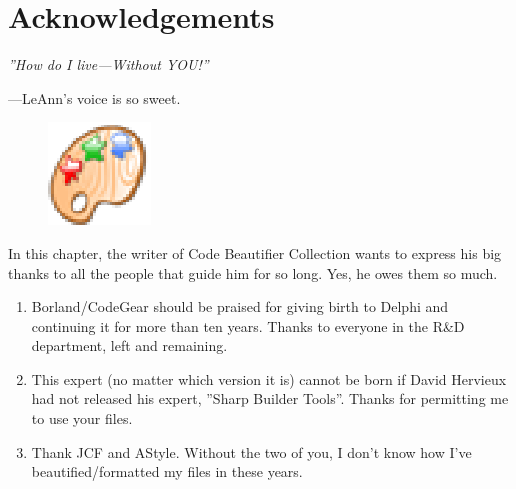 \chapter{Acknowledgements}
\emph{''How do I live---Without YOU!''}

---LeAnn's voice is so sweet.
\begin{figure}[!hbp]
\begin{center}
\includegraphics{images/cbc36}
\end{center}
\end{figure}
\newpage

In this chapter, the writer of Code Beautifier Collection wants to express his big thanks to all the people that guide him for so long. Yes, he owes them so much.
\begin{enumerate}
\item Borland/CodeGear should be praised for giving birth to Delphi and
continuing it for more than ten years. Thanks to everyone in the R\&D department, left and remaining.
\item This expert (no matter which version it is) cannot be born if David Hervieux had not released his expert, ''Sharp Builder Tools''. Thanks for permitting me to use your files.
\item Thank JCF and AStyle. Without the two of you, I don't know how I've beautified/formatted my files in these years.
\end{enumerate}
